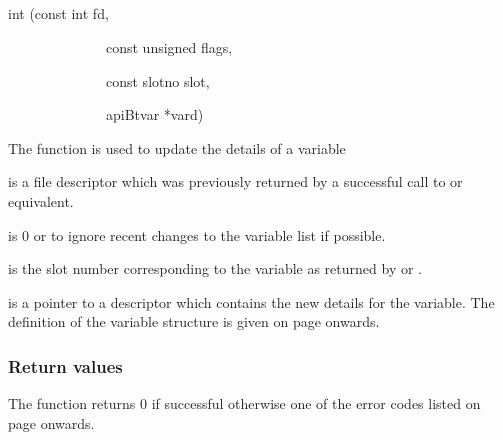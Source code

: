 \subsection{\funcnameXBvarupd{}}

\begin{expara}

int \funcnameXBvarupd{}(const int fd,

\ \ \ \ \ \ \ \ \ \ \ \ \ \ const unsigned flags,

\ \ \ \ \ \ \ \ \ \ \ \ \ \ const slotno slot,

\ \ \ \ \ \ \ \ \ \ \ \ \ \ apiBtvar *vard)

\end{expara}

The function \funcXBvarupd{} is used to update the
details of a variable

 is a file descriptor which was previously
returned by a successful call to \funcXBopen{} or equivalent.

 is 0 or
 to ignore recent changes to
the variable list if possible.

 is the slot number corresponding to the
variable as returned by \funcXBvarlist{} or
\funcXBvarfindslot{}.

 is a pointer to a descriptor which contains
the new details for the variable. The definition of the variable
structure is given on page \pageref{bkm:Varstructure} onwards.

\subsubsection{Return values}
The function returns 0 if successful otherwise one of the error codes
listed on page \pageref{errorcodes} onwards.

